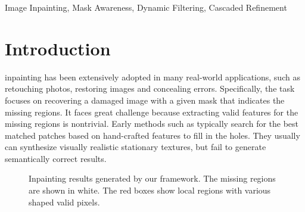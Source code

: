\documentclass[journal]{IEEEtran}
\begin{document}
\begin{IEEEkeywords}
Image Inpainting, Mask Awareness, Dynamic Filtering, Cascaded Refinement
\end{IEEEkeywords}






\IEEEpeerreviewmaketitle



\section{Introduction}


 inpainting has been extensively adopted in many real-world applications, such as retouching photos, restoring images and concealing errors.
Specifically, the task focuses on recovering a damaged image with a given mask that indicates the missing regions. It faces great challenge because extracting valid features for the missing regions is nontrivial.
Early methods such as \cite{hays2007scene,barnes2009patchmatch,sun2005image,efros1999texture,criminisi2004region} typically search for the best matched patches based on hand-crafted features to fill in the holes. 
They usually can synthesize visually realistic stationary textures, but fail to generate semantically correct results. 

\begin{figure}[t]
\centering
{}

\caption{Inpainting results generated by our framework. The missing regions are shown in white. The red boxes show local regions with various shaped valid pixels. }
\label{fig:first_show}
\end{figure}
 
\end{document}

